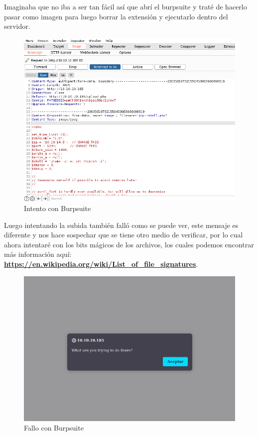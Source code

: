 \documentclass{article}
\begin{document}
Imaginaba que no iba a ser tan fácil así que abrí el burpsuite y traté de hacerlo pasar como imagen para luego borrar la extensión y ejecutarlo dentro del servidor.

\begin{figure}[h!]
	\center 
	\includegraphics[width=\textwidth]{images/magic/intento-burpsuit.png}
	\caption{Intento con Burpsuite}
\end{figure}

\clearpage

Luego intentando la subida también falló como se puede ver, este mensaje es diferente y nos hace sospechar que se tiene otro medio de verificar, por lo cual ahora intentaré con los bits mágicos de los archivos, los cuales podemos encontrar más información aquí: \\ 
\textbf{\href{https://en.wikipedia.org/wiki/List_of_file_signatures}{https://en.wikipedia.org/wiki/List\_of\_file\_signatures}}.

\begin{figure}[h!]
	\center 
	\includegraphics[width=\textwidth]{images/magic/fallo-burpsuite.png}
	\caption{Fallo con Burpsuite}
\end{figure}
\end{document}
